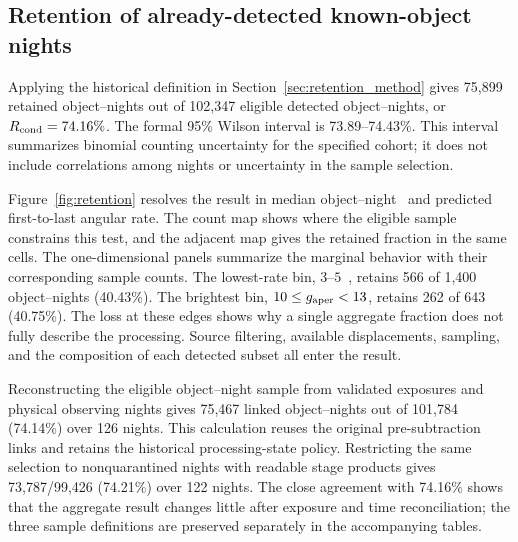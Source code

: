 \subsection{Retention of already-detected known-object nights}
\label{sec:retention_results}

Applying the historical definition in
Section~\ref{sec:retention_method} gives 75,899 retained
object--nights out of 102,347 eligible detected
object--nights, or $R_{\rm cond}=74.16\%$. The formal
95\% Wilson interval is 73.89--74.43\%. This interval
summarizes binomial counting uncertainty for the specified
cohort; it does not include correlations among nights or
uncertainty in the sample selection.

Figure~\ref{fig:retention} resolves the result in median
object--night \gaper\ and predicted first-to-last angular rate.
The count map shows where the eligible sample constrains this test,
and the adjacent map gives the retained fraction in the same cells.
The one-dimensional panels summarize the marginal behavior with
their corresponding sample counts. The lowest-rate bin, $3$--$5$~\rateunit,
retains 566 of 1,400 object--nights (40.43\%). The
brightest bin, $10\leq g_{\rm aper}<13$, retains 262 of 643
(40.75\%). The loss at these edges shows why a single
aggregate fraction does not fully describe the processing.
Source filtering, available displacements, sampling,
and the composition of each detected subset all enter
the result.

Reconstructing the eligible object--night sample from validated
exposures and physical observing nights gives 75,467 linked
object--nights out of 101,784 (74.14\%) over 126 nights.
This calculation reuses the original pre-subtraction links and
retains the historical processing-state policy. Restricting the same
selection to nonquarantined nights with readable stage products gives
73,787/99,426 (74.21\%) over 122 nights. The close agreement with
74.16\% shows that the aggregate result changes little after
exposure and time reconciliation; the three sample definitions are
preserved separately in the accompanying tables.

